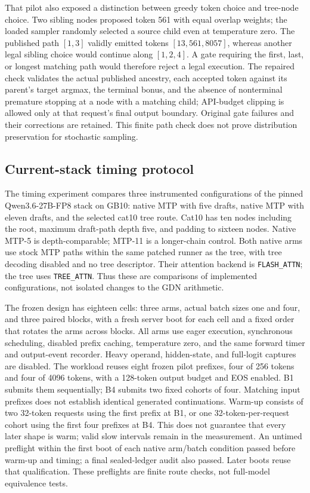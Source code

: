 \documentclass[conference]{IEEEtran}
\begin{document}
That pilot also exposed a distinction between greedy token choice and tree-node choice. Two sibling nodes proposed token 561 with equal overlap weights; the loaded sampler randomly selected a source child even at temperature zero. The published path $[1,3]$ validly emitted tokens $[13,561,8057]$, whereas another legal sibling choice would continue along $[1,2,4]$. A gate requiring the first, last, or longest matching path would therefore reject a legal execution. The repaired check validates the actual published ancestry, each accepted token against its parent's target argmax, the terminal bonus, and the absence of nonterminal premature stopping at a node with a matching child; API-budget clipping is allowed only at that request's final output boundary. Original gate failures and their corrections are retained. This finite path check does not prove distribution preservation for stochastic sampling.

\subsection{Current-stack timing protocol}
\label{sec:e1-timing}
The timing experiment compares three instrumented configurations of the pinned Qwen3.6-27B-FP8 stack on GB10: native MTP with five drafts, native MTP with eleven drafts, and the selected cat10 tree route. Cat10 has ten nodes including the root, maximum draft-path depth five, and padding to sixteen nodes. Native MTP-5 is depth-comparable; MTP-11 is a longer-chain control. Both native arms use stock MTP paths within the same patched runner as the tree, with tree decoding disabled and no tree descriptor. Their attention backend is \texttt{FLASH\_ATTN}; the tree uses \texttt{TREE\_ATTN}. Thus these are comparisons of implemented configurations, not isolated changes to the GDN arithmetic.

The frozen design has eighteen cells: three arms, actual batch sizes one and four, and three paired blocks, with a fresh server boot for each cell and a fixed order that rotates the arms across blocks. All arms use eager execution, synchronous scheduling, disabled prefix caching, temperature zero, and the same forward timer and output-event recorder. Heavy operand, hidden-state, and full-logit captures are disabled. The workload reuses eight frozen pilot prefixes, four of 256 tokens and four of 4096 tokens, with a 128-token output budget and EOS enabled. B1 submits them sequentially; B4 submits two fixed cohorts of four. Matching input prefixes does not establish identical generated continuations. Warm-up consists of two 32-token requests using the first prefix at B1, or one 32-token-per-request cohort using the first four prefixes at B4. This does not guarantee that every later shape is warm; valid slow intervals remain in the measurement. An untimed preflight within the first boot of each native arm/batch condition passed before warm-up and timing; a final sealed-ledger audit also passed. Later boots reuse that qualification. These preflights are finite route checks, not full-model equivalence tests.
\end{document}
